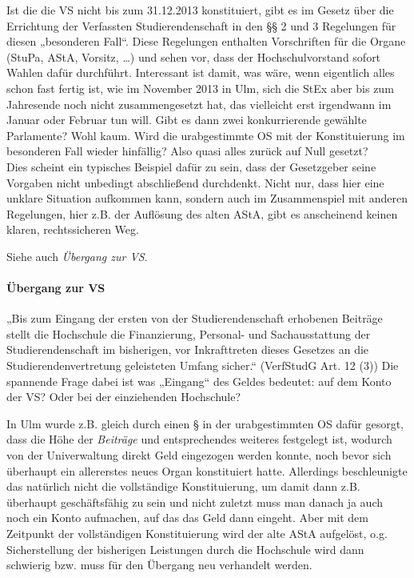 \documentclass[
10pt,
a4paper,
twoside,								%
titlepage=false,							%
draft=false								%
]{scrartcl}
\begin{document}
Ist die die VS nicht bis zum 31.12.2013 konstituiert, gibt es im Gesetz über die Errichtung der Verfassten Studierendenschaft in den §§ 2 und 3 Regelungen für diesen „besonderen Fall“. Diese Regelungen enthalten Vorschriften für die Organe (StuPa, AStA, Vorsitz, …) und sehen vor, dass der Hochschulvorstand sofort Wahlen dafür durchführt. Interessant ist damit, was wäre, wenn eigentlich alles schon fast fertig ist, wie im November 2013 in Ulm, sich die StEx aber bis zum Jahresende noch nicht zusammengesetzt hat, das vielleicht erst irgendwann im Januar oder Februar tun will. Gibt es dann zwei konkurrierende gewählte Parlamente? Wohl kaum. Wird die urabgestimmte OS mit der Konstituierung im besonderen Fall wieder hinfällig? Also quasi alles zurück auf Null gesetzt?\\
Dies scheint ein typisches Beispiel dafür zu sein, dass der Gesetzgeber seine Vorgaben nicht unbedingt abschließend durchdenkt. Nicht nur, dass hier eine unklare Situation aufkommen kann, sondern auch im Zusammenspiel mit anderen Regelungen, hier z.B. der Auflösung des alten AStA, gibt es anscheinend keinen klaren, rechtssicheren Weg.

Siehe auch \emph{Übergang zur VS}.


\paragraph{Übergang zur VS}

„Bis zum Eingang der ersten von der Studierendenschaft erhobenen Beiträge stellt die Hochschule die Finanzierung, Personal- und Sachausstattung der Studierendenschaft im bisherigen, vor Inkrafttreten dieses Gesetzes an die Studierendenvertretung geleisteten Umfang sicher.“ (VerfStudG Art. 12 (3)) Die spannende Frage dabei ist was „Eingang“ des Geldes bedeutet: auf dem Konto der VS? Oder bei der einziehenden Hochschule?

In Ulm wurde z.B. gleich durch einen § in der urabgestimmten OS dafür gesorgt, dass die Höhe der \emph{Beiträge} und entsprechendes weiteres festgelegt ist, wodurch von der Univerwaltung direkt Geld eingezogen werden konnte, noch bevor sich überhaupt ein allererstes neues Organ konstituiert hatte. Allerdings beschleunigte das natürlich nicht die vollständige Konstituierung, um damit dann z.B. überhaupt geschäftsfähig zu sein und nicht zuletzt muss man danach ja auch noch ein Konto aufmachen, auf das das Geld dann eingeht. Aber mit dem Zeitpunkt der vollständigen Konstituierung wird der alte AStA aufgelöst, o.g. Sicherstellung der bisherigen Leistungen durch die Hochschule wird dann schwierig bzw. muss für den Übergang neu verhandelt werden.
\end{document}
